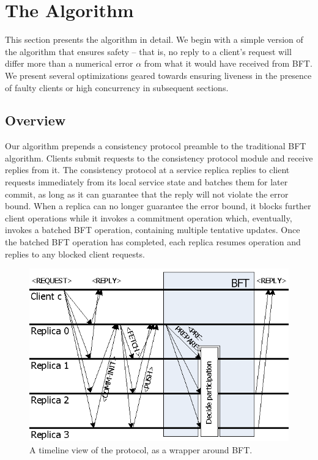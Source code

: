 \documentclass[twocolumn,10pt]{article}
\begin{document}
{


\section{The \Sys Algorithm}
\label{sec:algorithm}

This section presents the \Sys algorithm in detail. We begin with a
simple version of the algorithm that ensures safety -- that is, no
reply to a client's request will differ more than a numerical error
$\alpha$ from what it would have received from BFT. We present several
optimizations geared towards ensuring liveness in the presence of
faulty clients or high concurrency in subsequent sections.

\subsection{Overview}

Our algorithm prepends a consistency protocol preamble to the traditional BFT
algorithm.  Clients submit requests to the consistency protocol module and
receive replies from it.  The consistency protocol at a service replica replies to client
requests immediately from its local service state and batches them for
later commit, as long as it can
guarantee that the reply will not violate the error bound.  When a
replica can no longer guarantee the error bound, it blocks further
client operations while it invokes a commitment
operation which, eventually, invokes a batched BFT operation, containing
multiple tentative updates.  Once the batched BFT operation has
completed, each replica resumes operation and replies to any blocked
client requests.

\begin{figure}
\centering
\includegraphics{Overview.eps}
\caption{A timeline view of the protocol, as a wrapper around BFT.}
\label{fig:overview}
\end{figure}

}
\end{document}
